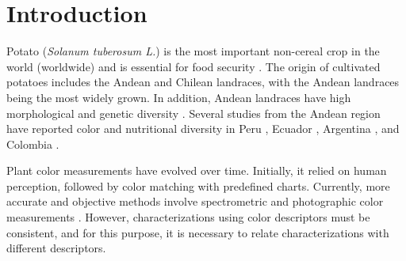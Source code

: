 \documentclass[pdflatex,sn-mathphys-ay]{sn-jnl}%
\begin{document}
\section{Introduction}\label{sec1}
Potato (\textit{Solanum tuberosum L.}) is the most important non-cereal crop in the world (worldwide) and is essential for food security \citep{diacolg3}. The origin of cultivated potatoes includes the Andean and Chilean landraces, with the Andean landraces being the most widely grown. In addition, Andean landraces have high morphological and genetic diversity \citep{spooner2005single}. Several studies from the Andean region have reported color and nutritional diversity in Peru \citep{bellumori2020study}, Ecuador \citep{balladares2018evaluacion}, Argentina \citep{calliope2018biodiversity}, and Colombia \citep{Berdugo2017,berdugo2023phenotypic}. 


Plant color measurements have evolved over time. Initially, it relied on human perception, followed by color matching with predefined charts. Currently, more accurate and objective methods involve spectrometric and photographic color measurements \citep{kasajima2019measuring}. However, characterizations using color descriptors must be consistent, and for this purpose, it is necessary to relate characterizations with different descriptors.





\end{document}
